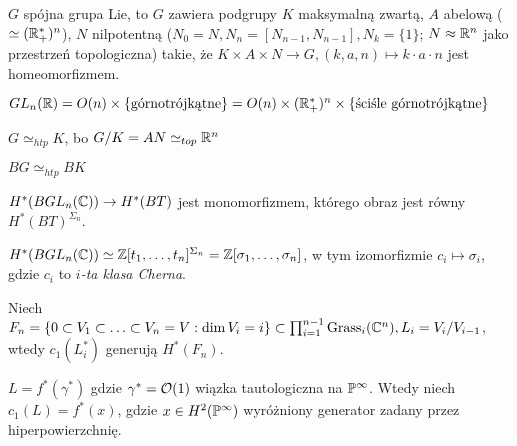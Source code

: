 

 

 \begin{twierdzeniebd}[Iwasawa]
  $G$ spójna grupa Lie, to $G$ zawiera podgrupy $K$ maksymalną zwartą, $A$ abelową ($\simeq ({\mathbb{R}}_+^\ast)^n$), $N$ nilpotentną ($N_0=N, N_n=[N_{n-1},N_{n-1}], N_k=\{1\}$; $N \approx {\mathbb{R}}^n$ jako przestrzeń topologiczna) takie, że $K \times A \times N \to G, (k,a,n) \mapsto k \cdot a \cdot n$ jest homeomorfizmem.
 \end{twierdzeniebd}
 
 \begin{przyklad}
  $GL_n({\mathbb{R}}) = O(n) \times \{\text{górnotrójkątne}\} = O(n) \times ({\mathbb{R}}_+^\ast)^n \times \{\text{ściśle górnotrójkątne}\}$
 \end{przyklad}
 
 \begin{uwaga}
  $G \simeq_{htp} K$, bo $G/K = AN \simeq_{top} {\mathbb{R}}^n$
 \end{uwaga}
 
 \begin{wniosek}
  $BG \simeq_{htp} BK$
 \end{wniosek}
 
 \begin{twierdzenie}
  $H^\ast(BGL_n({\mathbb{C}})) \to H^\ast(BT)$ jest monomorfizmem, którego obraz jest równy $H^\ast(BT)^{\Sigma_n}$.
 \end{twierdzenie}
 
 \begin{wniosek}
  $H^\ast(BGL_n({\mathbb{C}})) \simeq {\mathbb{Z}}[t_1, \ldots, t_n]^{\Sigma_n} = {\mathbb{Z}}[\sigma_1, \ldots, \sigma_n]$, w tym izomorfizmie $c_i \mapsto \sigma_i$, gdzie $c_i$ to \emph{$i$-ta klasa Cherna}.
 \end{wniosek}
 
 \begin{lemat}
  Niech $F_n=\{ 0 \subset V_1 \subset \ldots \subset V_n = V: \dim V_i=i\} \subset\prod_{i=1}^{n-1} {\mathrm{Grass}}_i({\mathbb{C}}^n), L_i = V_i/V_{i-1}$, wtedy $c_1(L_i^\ast)$ generują $H^\ast(F_n)$.
 \end{lemat}
 
 \begin{definicja}
  $L=f^\ast(\gamma^\ast)$ gdzie $\gamma^\ast={\mathcal{O}}(1)$ wiązka tautologiczna na ${\mathbb{P}}^\infty$.
  Wtedy niech $c_1(L) = f^\ast(x)$, gdzie $x \in H^2({\mathbb{P}}^\infty)$ wyróżniony generator zadany przez hiperpowierzchnię.
 \end{definicja}
 

